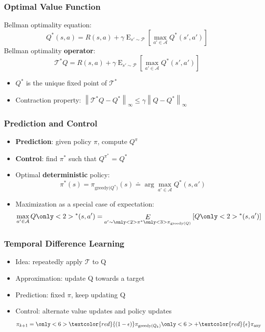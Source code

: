 \documentclass{beamer}
\newcommand{\expect}[2]{\mathop{E}_{#1}\left[#2\right]}
\newcommand{\hold}{\addtocounter{framenumber}{-1}}
\newcommand{\jump}{\addtocounter{framenumber}{1}}
\newcommand{\norm}[2][\infty]{\left\|#2\right\|_{#1}}
\begin{document}
\begin{frame}
\frametitle{Optimal Value Function}
Bellman optimality equation:
\[
	Q^*(s,a) = R(s,a) + \gamma\expect{
	s'\sim\mathcal{P}}{
	\max_{a'\in \mathcal{A}}{Q^*(s',a')}}
\]
Bellman optimality \textbf{operator}:
\[
	\mathcal{T}^*Q = 
	R(s,a) + \gamma\expect{
		s'\sim\mathcal{P}}{
	\max_{a'\in \mathcal{A}}{Q^*(s',a')}}
\]
\begin{itemize}
\item $Q^*$ is the unique fixed point of $\mathcal{T^*}$
\item Contraction property: $\norm[\infty]{\mathcal{T}^*Q-Q^*} \leq \gamma\norm[\infty]{Q-Q^*}$
\end{itemize}
\end{frame}

\hold\hold\hold
\begin{frame}
\frametitle{Prediction and Control}
\begin{itemize}
\item \textbf{Prediction}: given policy $\pi$, compute $Q^{\pi}$

\item \textbf{Control}: find $\pi^*$ such that $Q^{\pi^*}$ = $Q^*$
\end{itemize}
\end{frame}
\jump\jump

\begin{frame}
\begin{itemize}
\item<1-> Optimal \textbf{deterministic} policy:
\[
	\pi^*(s) =
	\pi_{\text{greedy($Q^*$)}}(s) \doteq \arg\max_{a'\in\mathcal{A}}Q^*(s,a') 
\]
\item<2->Maximization as a special case of expectation:
\[
	\max_{a' \in \mathcal{A}}Q
	\only<2>{^*}
	(s,a') = \expect{a'\sim
	\only<2>{\pi^*}
	\only<3>{\pi_{\text{greedy($Q$)}}}
	}{Q
	\only<2>{^*}
	(s,a')}
\]
\end{itemize}
\end{frame}

\begin{frame}
\frametitle{Temporal Difference Learning}
\begin{itemize}
\item<1-> Idea: repeatedly apply $\mathcal{T}$ to Q
\item<2-> Approximation: update Q towards a target
\item<4> Prediction: fixed $\pi$, keep updating Q
\item<5-> Control: alternate value updates and policy updates
\[
	\pi_{k+1} = \only<6>{\textcolor{red}{(1-\epsilon)}}\pi_{\text{greedy($Q_{k}$)}} \only<6>{+\textcolor{red}{\epsilon}\pi_{\text{any}}}
\]
\end{itemize}
\end{frame}
\end{document}
